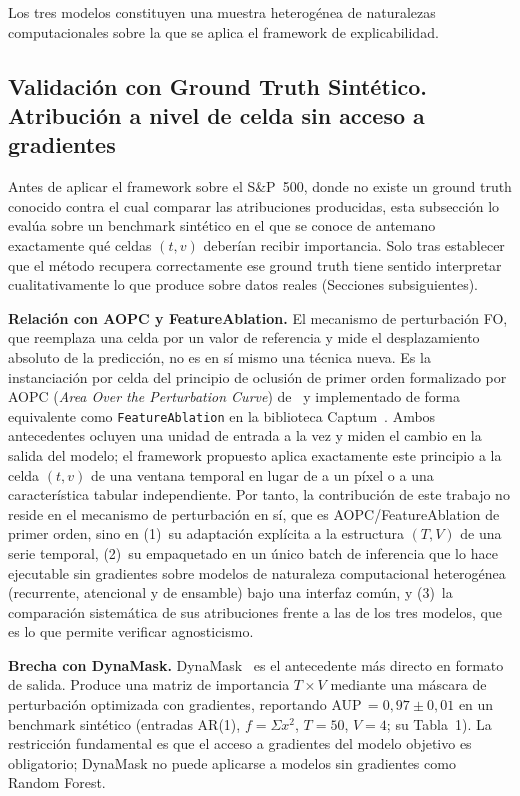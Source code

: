 \documentclass[conference, letterpaper]{IEEEtran}
\begin{document}
Los tres modelos constituyen una muestra heterogénea de naturalezas
computacionales sobre la que se aplica el framework de
explicabilidad.

\subsection{Validación con Ground Truth Sintético. Atribución a nivel de celda sin acceso a gradientes}
\label{sec:avance1}

Antes de aplicar el framework sobre el S\&P~500, donde no existe un
ground truth conocido contra el cual comparar las atribuciones
producidas, esta subsección lo evalúa sobre un benchmark sintético
en el que se conoce de antemano exactamente qué celdas $(t, v)$
deberían recibir importancia. Solo tras establecer que el método
recupera correctamente ese ground truth tiene sentido interpretar
cualitativamente lo que produce sobre datos reales (Secciones
subsiguientes).

\textbf{Relación con AOPC y FeatureAblation.}
El mecanismo de perturbación FO, que reemplaza una celda por un valor
de referencia y mide el desplazamiento absoluto de la
predicción, no es en sí mismo una técnica nueva. Es la
instanciación por celda del principio de oclusión de primer orden
formalizado por AOPC (\emph{Area Over the Perturbation Curve})
de~\cite{samek2017aopc} y implementado de forma equivalente como
\texttt{FeatureAblation} en la biblioteca Captum~\cite{captum2020}.
Ambos antecedentes ocluyen una unidad de entrada a la vez y miden
el cambio en la salida del modelo; el framework propuesto aplica
exactamente este principio a la celda $(t, v)$ de una ventana
temporal en lugar de a un píxel o a una característica tabular
independiente. Por tanto, la contribución de este trabajo no reside
en el mecanismo de perturbación en sí, que es AOPC/FeatureAblation
de primer orden, sino en (1)~su adaptación explícita a la estructura
$(T, V)$ de una serie temporal, (2)~su empaquetado en un único batch
de inferencia que lo hace ejecutable sin gradientes sobre modelos
de naturaleza computacional heterogénea (recurrente, atencional y de
ensamble) bajo una interfaz común, y (3)~la comparación sistemática
de sus atribuciones frente a las de los tres modelos, que es lo que
permite verificar agnosticismo.

\textbf{Brecha con DynaMask.}
DynaMask~\cite{crabbe2021} es el antecedente más directo en formato de
salida. Produce una matriz de importancia $T{\times}V$ mediante una
máscara de perturbación optimizada con gradientes, reportando
AUP\,$=0{,}97\pm0{,}01$ en un benchmark sintético (entradas AR(1),
$f{=}\Sigma x^2$, $T{=}50$, $V{=}4$; su Tabla~1). La restricción
fundamental es que el acceso a gradientes del modelo objetivo es
obligatorio; DynaMask no puede aplicarse a modelos sin gradientes
como Random Forest.
\end{document}
